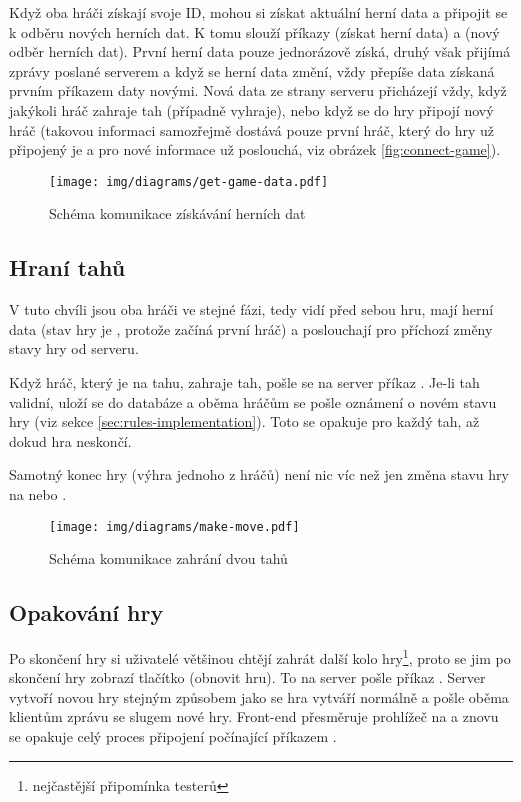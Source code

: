 
Když oba hráči získají svoje ID, mohou si získat aktuální herní data a připojit
se k odběru nových herních dat. K tomu slouží příkazy  (získat
herní data) a  (nový odběr herních dat). První herní
data pouze jednorázově získá, druhý však přijímá zprávy poslané serverem a když
se herní data změní, vždy přepíše data získaná prvním příkazem daty novými.
Nová data ze strany serveru přicházejí vždy, když jakýkoli hráč zahraje tah
(případně vyhraje), nebo když se do hry připojí nový hráč (takovou informaci
samozřejmě dostává pouze první hráč, který do hry už připojený je a pro nové
informace už poslouchá, viz obrázek \ref{fig:connect-game}).

\begin{figure}[H]
    \centering
    \texttt{[image: img/diagrams/get-game-data.pdf]}
    \caption{Schéma komunikace získávání herních dat}
    \label{fig:get-game-data}
\end{figure}

\subsection{Hraní tahů}

V tuto chvíli jsou oba hráči ve stejné fázi, tedy vidí před sebou hru, mají
herní data (stav hry je , protože začíná první hráč) a
poslouchají pro příchozí změny stavy hry od serveru.

Když hráč, který je na tahu, zahraje tah, pošle se na server příkaz .
Je-li tah validní, uloží se do databáze a oběma hráčům se pošle oznámení
 o novém stavu hry (viz sekce \ref{sec:rules-implementation}).
Toto se opakuje pro každý tah, až dokud hra neskončí.

Samotný konec hry (výhra jednoho z hráčů) není nic víc než jen změna stavu hry
na  nebo .

\begin{figure}[H]
    \centering
    \texttt{[image: img/diagrams/make-move.pdf]}
    \caption{Schéma komunikace zahrání dvou tahů}
    \label{fig:make-move}
\end{figure}

\subsection{Opakování hry}
Po skončení hry si uživatelé většinou chtějí zahrát další kolo
hry\footnote{nejčastější připomínka testerů}, proto se jim po skončení hry
zobrazí tlačítko  (obnovit hru). To na server pošle příkaz
. Server vytvoří novou hry stejným způsobem jako se hra vytváří
normálně a pošle oběma klientům zprávu  se slugem nové hry.
Front-end přesměruje prohlížeč na  a znovu se opakuje celý
proces připojení počínající příkazem .

